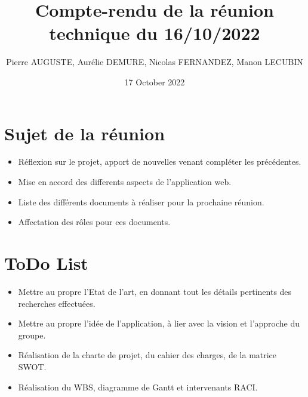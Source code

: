 \documentclass{article}
\title{Compte-rendu de la réunion technique du 16/10/2022}
\author{Pierre AUGUSTE, Aurélie DEMURE, Nicolas FERNANDEZ, Manon LECUBIN}
\date{17 October 2022}
\begin{document}
\maketitle

\section{Sujet de la réunion}

\begin{itemize}
    \item Réflexion sur le projet, apport de nouvelles venant compléter les précédentes.
    \item Mise en accord des differents aspects de l'application web.
    \item Liste des différents documents à réaliser pour la prochaine réunion.
    \item Affectation des rôles pour ces documents.
\end{itemize}

\section{ToDo List}
\begin{itemize}
    \item Mettre au propre l'Etat de l'art, en donnant tout les détails pertinents des recherches effectuées.
    \item Mettre au propre l'idée de l'application, à lier avec la vision et l'approche du groupe.
    \item Réalisation de la charte de projet, du cahier des charges, de la matrice SWOT.
    \item Réalisation du WBS, diagramme de Gantt et intervenants RACI.
\end{itemize}
\end{document}

